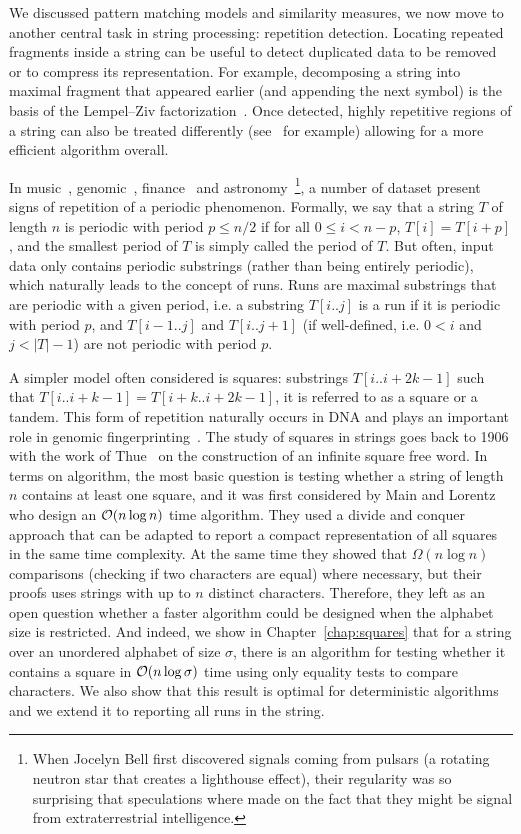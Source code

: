 We discussed pattern matching models and similarity measures, we now move to another central task in string processing: repetition detection. Locating repeated fragments inside a string can be useful to detect duplicated data to be removed or to compress its representation. For example, decomposing a string into maximal fragment that appeared earlier (and appending the next symbol) is the basis of the Lempel--Ziv factorization~\cite{ziv1977universal}. Once detected, highly repetitive regions of a string can also be treated differently (see~\cite{Porat:09} for example) allowing for a more efficient algorithm overall.

In music~\cite{arom1989time}, genomic~\cite{pich2018somatic}, finance~\cite{harvey2007trends} and astronomy~\cite{hewish1979observation}\footnote{ When Jocelyn Bell first discovered signals coming from pulsars (a rotating neutron star that creates a lighthouse effect), their regularity was so surprising that speculations where made on the fact that they might be signal from extraterrestrial intelligence.}, a number of dataset present signs of repetition of a periodic phenomenon.
Formally, we say that a string $T$ of length $n$ is periodic with period $p \leq n/2$ if for all $0 \leq i < n - p$, $T[i]=T[i+p]$, and the smallest period of $T$ is simply called the period of $T$.
%
But often, input data only contains periodic substrings (rather than being entirely periodic), which naturally leads to the concept of runs. Runs are maximal substrings that are periodic with a given period, i.e. a substring $T[i..j]$ is a run if it is periodic with period $p$, and $T[i-1..j]$ and $T[i..j+1]$ (if well-defined, i.e. $0<i$ and $j<|T|-1$) are not periodic with period $p$. 

A simpler model often considered is squares: substrings $T[i..i+2k-1]$ such that $T[i..i+k-1]=T[i+k..i+2k-1]$, it is referred to as a square or a tandem. This form of repetition naturally occurs in DNA and plays an important role in genomic fingerprinting~\cite{Kolpakov2003,GYMREK20179}. 
%
The study of squares in strings goes back to 1906 with the work of Thue~\cite{thue1906} on the construction of an infinite square free word. In terms on algorithm, the most basic question is testing whether a string of length $n$ contains at least one square, and it was first considered by Main and Lorentz~\cite{Main1984} who design an $\mathcal{O}(n \log n)$ time algorithm. They used a divide and conquer approach that can be adapted to report a compact representation of all squares in the same time complexity. At the same time they showed that $\Omega(n\log n)$ comparisons (checking if two characters are equal) where necessary, but their proofs uses strings with up to $n$ distinct characters. Therefore, they left as an open question whether a faster algorithm could be designed when the alphabet size is restricted.  
And indeed, we show in Chapter~\ref{chap:squares} that for a string over an unordered alphabet of size $\sigma$, there is an algorithm for testing whether it contains a square in $\mathcal{O}(n\log \sigma)$ time using only equality tests to compare characters. We also show that this result is optimal for deterministic algorithms and we extend it to reporting all runs in the string.

